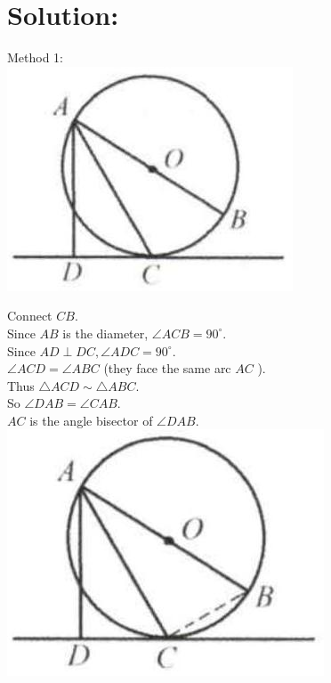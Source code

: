 \documentclass[10pt]{article}
\begin{document}
\section*{Solution:}
Method 1:\\
\includegraphics[max width=\textwidth, center]{2025_04_17_97bc1f7e44d93c271a88g-164(1)}

Connect \(C B\).\\
Since \(A B\) is the diameter, \(\angle A C B=90^{\circ}\).\\
Since \(A D \perp D C, \angle A D C=90^{\circ}\).\\
\(\angle A C D=\angle A B C\) (they face the same arc \(A C\) ).\\
Thus \(\triangle A C D \sim \triangle A B C\).\\
So \(\angle D A B=\angle C A B\).\\
\(A C\) is the angle bisector of \(\angle D A B\).\\
\includegraphics[max width=\textwidth, center]{2025_04_17_97bc1f7e44d93c271a88g-164(2)}
\end{document}
